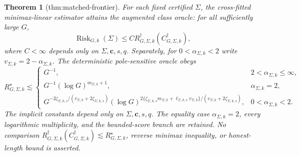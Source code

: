 \documentclass{article}
\newtheorem{theorem}{Theorem}
\begin{document}
\begin{theorem}[thm:matched-frontier]\label{thm:matched-frontier}
For each fixed certified \(\Sigma\), the cross-fitted minimax-linear estimator attains the augmented class oracle: for all sufficiently large \(G\), \[\operatorname{Risk}_{G,k}(\Sigma)\le C R_{G,\Sigma,k}^{\dagger}(C_{G,\Sigma,k}^{\dagger}),\] where \(C<\infty\) depends only on \(\Sigma,\mathbf c,s,q\). Separately, for \(0<\alpha_{\Sigma,k}<2\) write \(v_{\Sigma,k}=2-\alpha_{\Sigma,k}\). The deterministic pole-sensitive oracle obeys \[R_{G,\Sigma,k}^{\star}\lesssim\begin{cases}G^{-1},&2<\alpha_{\Sigma,k}\le\infty,\\G^{-1}(\log G)^{m_{\Sigma,k}+1},&\alpha_{\Sigma,k}=2,\\G^{-2\zeta_{\Sigma,k,s}/(v_{\Sigma,k}+2\zeta_{\Sigma,k,s})}(\log G)^{2\{\zeta_{\Sigma,k,s}m_{\Sigma,k}+\ell_{\Sigma,k,s}v_{\Sigma,k}\}/(v_{\Sigma,k}+2\zeta_{\Sigma,k,s})},&0<\alpha_{\Sigma,k}<2.\end{cases}\] The implicit constants depend only on \(\Sigma,\mathbf c,s,q\). The equality case \(\alpha_{\Sigma,k}=2\), every logarithmic multiplicity, and the bounded-score branch are retained. No comparison \(R_{G,\Sigma,k}^{\dagger}(C_{G,\Sigma,k}^{\dagger})\lesssim R_{G,\Sigma,k}^{\star}\), reverse minimax inequality, or honest-length bound is asserted.
\end{theorem}
\end{document}
